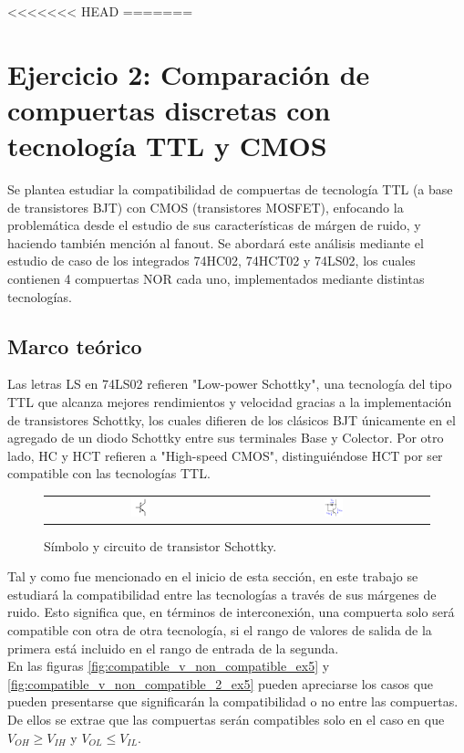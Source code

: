 <<<<<<< HEAD
=======
\section{Ejercicio 2: Comparaci\'on de compuertas discretas con tecnolog\'ia TTL y CMOS}
Se plantea estudiar la compatibilidad de compuertas de tecnología TTL (a base de transistores BJT) con CMOS (transistores MOSFET), enfocando la problemática desde el 
estudio de sus características de márgen de ruido, y haciendo también mención al fanout. 
Se abordará este análisis mediante el estudio de caso de los integrados 74HC02, 74HCT02 y 74LS02, los cuales contienen 4 compuertas NOR cada uno, implementados mediante 
distintas tecnologías.



\subsection{Marco teórico}
Las letras LS en 74LS02 refieren "Low-power Schottky", una tecnología del tipo TTL que alcanza mejores rendimientos y velocidad gracias a la implementación de 
transistores Schottky, los cuales difieren de los clásicos BJT únicamente en el agregado de un diodo Schottky entre sus terminales Base y Colector.
Por otro lado, HC y HCT refieren a "High-speed CMOS", distinguiéndose HCT por ser compatible con las tecnologías TTL.

\begin{figure}[H]
    \centering
    \begin{tabular}{c c}
        \includegraphics[width=0.1\textwidth]{../EJ2/Recursos/schottky_transistor_symbol} &
        \includegraphics[width=0.1\textwidth]{../EJ2/Recursos/schottky_transistor_circuit}
    \end{tabular}
    \caption{Símbolo y circuito de transistor Schottky.}
    \label{fig:schottky_transistor_symbol_and_circuit_ex5}
\end{figure}

Tal y como fue mencionado en el inicio de esta sección, en este trabajo se estudiará la compatibilidad entre las tecnologías a través de sus márgenes de ruido.
Esto significa que, en términos de interconexión, una compuerta solo será compatible con otra de otra tecnología, si el rango de valores de salida de la primera está 
incluido en el rango de entrada de la segunda. \\
En las figuras \ref{fig:compatible_v_non_compatible_ex5} y \ref{fig:compatible_v_non_compatible_2_ex5} pueden apreciarse los casos que pueden presentarse que significarán la compatibilidad o no entre las compuertas.
De ellos se extrae que las compuertas serán compatibles solo en el caso en que $V_{OH} \geq V_{IH}$ y $V_{OL} \leq V_{IL}$.

